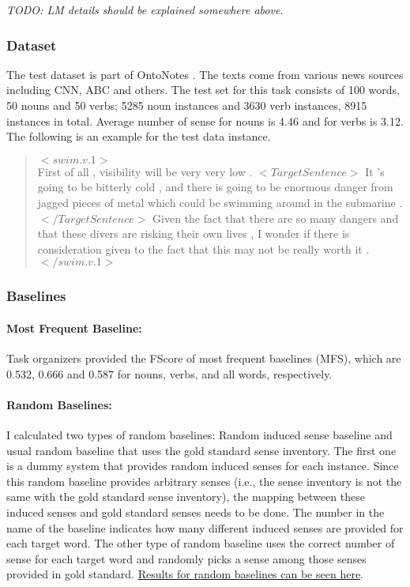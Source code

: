
\emph{TODO: LM details should be explained somewhere above.}


\subsubsection{Dataset} 
The test dataset is part of OntoNotes \cite{hovy06ontonotes}. The texts come from various news sources including CNN, ABC and others. The test set for this task consists of 100 words, 50 nouns and 50 verbs; 5285 noun instances and 3630 verb instances, 8915 instances in total. Average number of sense for nouns is 4.46 and for verbs is 3.12. The following is an example for the test data instance.

\begin{quote}
  $<swim.v.1>$ \\
 First of all , visibility will be very very low . $<TargetSentence>$ It 
 's going to be bitterly cold , and there is going to be enormous 
 danger from jagged pieces of metal which could be swimming around in
 the submarine . $</TargetSentence>$ Given the fact that there are so many
 dangers and that these divers are risking their own lives , I wonder
 if there is consideration given to the fact that this may not be 
 really worth it . \\
 $</swim.v.1>$
\end{quote}




\subsubsection{Baselines}

\paragraph{Most Frequent Baseline:} Task organizers provided the FScore of most frequent baselines (MFS), which are 0.532, 0.666 and 0.587 for nouns, verbs, and all words, respectively.
\paragraph{Random Baselines:}I calculated two types of random baselines: Random induced sense baseline and usual random baseline that uses the gold standard sense inventory. The first one is a dummy system that provides random induced senses for each instance. Since this random baseline provides arbitrary senses (i.e., the sense inventory is not the same with the gold standard sense inventory), the mapping between these induced senses and gold standard senses needs to be done. The number in the name of the baseline indicates how many different induced senses are provided for each target word. The other type of random baseline uses the correct number of sense for each target word and randomly picks a sense among those senses provided in gold standard. \href{http://goo.gl/f2X0da}{Results for random baselines can be seen here}.
